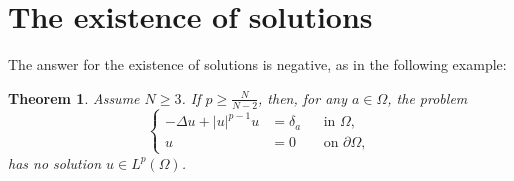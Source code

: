 \documentclass[a4paper, 11pt]{report}
\newtheorem{thm}{Theorem}[chapter]
\theoremstyle{definition}\newtheorem*{rmk}{Remark}
\begin{document}
\section{The existence of solutions}
\mbox{}

The answer for the existence of solutions is negative, as in the following example:

\begin{thm}
Assume $N\ge 3$. If $p \ge \frac{N}{N-2}$, then, for any $a\in \Omega$, the problem
\begin{equation}\label{exmain}
\left\{
\begin{aligned}
-\Delta u + |u|^{p-1}u & = \delta_a && \text{in } \Omega , \\
u & = 0 && \text{on } \partial \Omega ,
\end{aligned}
\right.
\end{equation}
has no solution $u\in L^p(\Omega)$.
\end{thm}
\end{document}
